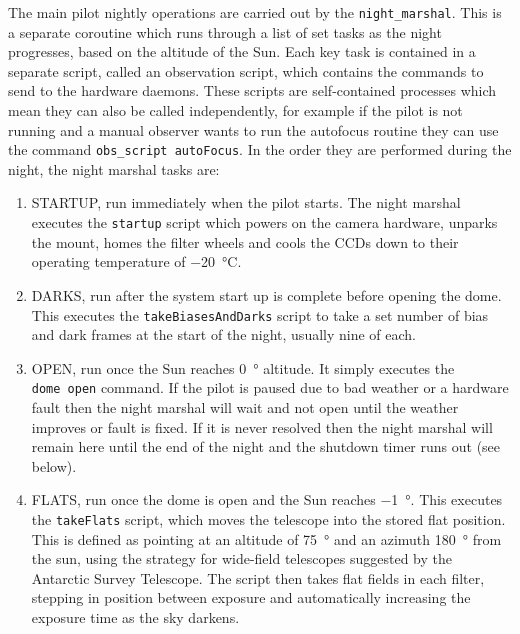 \begin{colsection}
\begin{colsection}
\begin{itemize}
\end{itemize}

The main pilot nightly operations are carried out by the \texttt{night\_marshal}. This is a separate coroutine which runs through a list of set tasks as the night progresses, based on the altitude of the Sun. Each key task is contained in a separate script, called an observation script, which contains the commands to send to the hardware daemons. These scripts are self-contained processes which mean they can also be called independently, for example if the pilot is not running and a manual observer wants to run the autofocus routine they can use the command \texttt{obs\_script~autoFocus}.  In the order they are performed during the night, the night marshal tasks are:

\begin{enumerate}

\item STARTUP, run immediately when the pilot starts. The night marshal executes the \texttt{startup} script which powers on the camera hardware, unparks the mount, homes the filter wheels and cools the CCDs down to their operating temperature of \SI{-20}{\celsius}.

\item DARKS, run after the system start up is complete before opening the dome. This executes the \texttt{takeBiasesAndDarks} script to take a set number of bias and dark frames at the start of the night, usually nine of each.

\item OPEN, run once the Sun reaches \SI{0}{\degree} altitude. It simply executes the \texttt{dome~open} command. If the pilot is paused due to bad weather or a hardware fault then the night marshal will wait and not open until the weather improves or fault is fixed. If it is never resolved then the night marshal will remain here until the end of the night and the shutdown timer runs out (see below).

\item FLATS, run once the dome is open and the Sun reaches \SI{-1}{\degree}. This executes the \texttt{takeFlats} script, which moves the telescope into the stored flat position. This is defined as pointing at an altitude of \SI{75}{\degree} and an azimuth \SI{180}{\degree} from the sun, using the strategy for wide-field telescopes suggested by the Antarctic Survey Telescope\cite{flats}. The script then takes flat fields in each filter, stepping in position between exposure and automatically increasing the exposure time as the sky darkens.


\end{enumerate}
\end{colsection}
\end{colsection}
